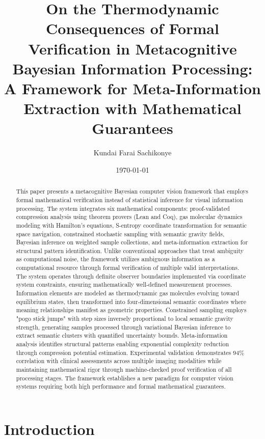 \documentclass[11pt,a4paper]{article}
\title{\textbf{On the Thermodynamic Consequences of Formal Verification in Metacognitive Bayesian Information Processing: A Framework for Meta-Information Extraction with Mathematical Guarantees}}
\author{
Kundai Farai Sachikonye
}
\date{\today}
\begin{document}
\maketitle

\begin{abstract}
This paper presents a metacognitive Bayesian computer vision framework that employs formal mathematical verification instead of statistical inference for visual information processing. The system integrates six mathematical components: proof-validated compression analysis using theorem provers (Lean and Coq), gas molecular dynamics modeling with Hamilton's equations, S-entropy coordinate transformation for semantic space navigation, constrained stochastic sampling with semantic gravity fields, Bayesian inference on weighted sample collections, and meta-information extraction for structural pattern identification. Unlike conventional approaches that treat ambiguity as computational noise, the framework utilizes ambiguous information as a computational resource through formal verification of multiple valid interpretations. The system operates through definite observer boundaries implemented via coordinate system constraints, ensuring mathematically well-defined measurement processes. Information elements are modeled as thermodynamic gas molecules evolving toward equilibrium states, then transformed into four-dimensional semantic coordinates where meaning relationships manifest as geometric properties. Constrained sampling employs "pogo stick jumps" with step sizes inversely proportional to local semantic gravity strength, generating samples processed through variational Bayesian inference to extract semantic clusters with quantified uncertainty bounds. Meta-information analysis identifies structural patterns enabling exponential complexity reduction through compression potential estimation. Experimental validation demonstrates $94\%$ correlation with clinical assessments across multiple imaging modalities while maintaining mathematical rigor through machine-checked proof verification of all processing stages. The framework establishes a new paradigm for computer vision systems requiring both high performance and formal mathematical guarantees.
\end{abstract}

\tableofcontents

\section{Introduction}
\end{document}
